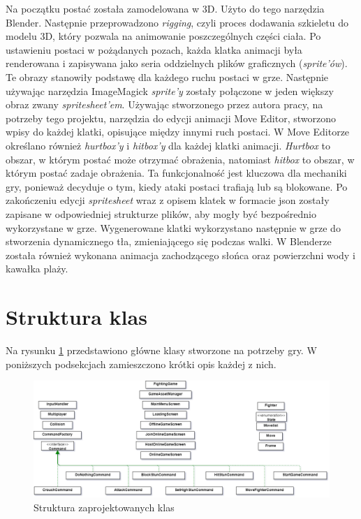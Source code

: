 Na początku postać została zamodelowana w 3D. Użyto do tego narzędzia Blender. Następnie przeprowadzono \emph{rigging}, czyli proces dodawania szkieletu do modelu 3D, który pozwala na animowanie poszczególnych części ciała. Po ustawieniu postaci w pożądanych pozach, każda klatka animacji była renderowana i zapisywana jako seria oddzielnych plików graficznych (\emph{sprite'ów}). Te obrazy stanowiły podstawę dla każdego ruchu postaci w grze. Następnie używając narzędzia ImageMagick \emph{sprite'y} zostały połączone w jeden większy obraz zwany \emph{spritesheet'em}. Używając stworzonego przez autora pracy, na potrzeby tego projektu, narzędzia do edycji animacji Move Editor, stworzono wpisy do każdej klatki, opisujące między innymi ruch postaci. W Move Editorze określano również \emph{hurtbox'y} i \emph{hitbox'y} dla każdej klatki animacji. \emph{Hurtbox} to obszar, w którym postać może otrzymać obrażenia, natomiast \emph{hitbox} to obszar, w którym postać zadaje obrażenia. Ta funkcjonalność jest kluczowa dla mechaniki gry, ponieważ decyduje o tym, kiedy ataki postaci trafiają lub są blokowane. Po zakończeniu edycji \emph{spritesheet} wraz z opisem klatek w formacie json zostały zapisane w odpowiedniej strukturze plików, aby mogły być bezpośrednio wykorzystane w grze. Wygenerowane klatki wykorzystano następnie w grze do stworzenia dynamicznego tła, zmieniającego się podczas walki. W Blenderze została również wykonana animacja zachodzącego słońca oraz powierzchni wody i kawałka plaży. 

\section{Struktura klas}
Na rysunku \ref{fig:struktura_klas} przedstawiono główne klasy stworzone na potrzeby gry. W poniższych podsekcjach zamieszczono krótki opis każdej z nich.
\begin{figure}[htb]
	\centering
		\includegraphics[width=1\linewidth]{rys03/struktura_klas}
	\caption{Struktura zaprojektowanych klas}
	\label{fig:struktura_klas}
\end{figure}


